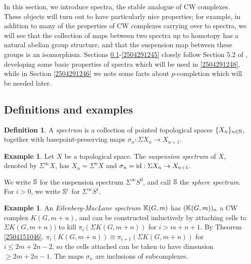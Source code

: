 \documentclass[11pt, titlepage]{article} %
\def\bb{\ensuremath\mathbb}
\def\nat{\ensuremath\mathbb{N}}
\def\id{\ensuremath\text{id}}
\numberwithin{equation}{subsection}
\theoremstyle{plain}
\theoremstyle{definition}
\newtheorem{definition}[theorem]{Definition}
\newtheorem{example}[theorem]{Example}
\begin{document}
In this section, we introduce spectra, the stable analogue of CW complexes. These objects will turn out to have particularly nice properties; for example, in addition to many of the properties of CW complexes carrying over to spectra, we will see that the collection of maps between two spectra up to homotopy has a natural abelian group structure, and that the suspension map between these groups is an isomorphism. Sections \ref{2504291244}-\ref{2504291245} closely follow Section 5.2 of \autocite{hatcher5}, developing some basic properties of spectra which will be used in \ref{2504291248}, while in Section \ref{2504291246} we note some facts about \(p\)-completion which will be needed later. 

\subsection{Definitions and examples}\label{2504291244}

\begin{definition}
A \textit{spectrum} is a collection of pointed topological spaces \(\{X_n\}_{n\in \nat}\), together with basepoint-preserving maps \(\sigma_n : \Sigma X_n \to X_{n+1}\).
\end{definition}

\begin{example}
Let \(X\) be a topological space. The \textit{suspension spectrum} of \(X\), denoted by \(\Sigma^\infty X\), has \(X_n=\Sigma^nX\) and \(\sigma_n=\id : \Sigma X_n \to X_{n+1}\).
\end{example}

We write \(\bb{S}\) for the suspension spectrum \(\Sigma^\infty S^0\), and call \(\bb{S}\) the \textit{sphere spectrum}. For \(i>0\), we write \(\bb{S}^i\) for \(\Sigma^\infty S^i\).%



\begin{example}\label{2504251659}
An \textit{Eilenberg-MacLane spectrum} \(\bb{K}(G,m)\) has \((\bb{K}(G,m))_n\) a CW complex \(K(G,m+n)\), and can be constructed inductively by attaching cells to \(\Sigma K(G, m+n))\) to kill \(\pi_i(\Sigma K(G, m+n))\) for \(i > m+n+1\). By Theorem \ref{2504151046}, \(\pi_i(K(G, m+n))\cong \pi_{i+1}(\Sigma K(G, m+n))\) for \(i \leq 2m+2n-2\), so the cells attached can be taken to have dimension \(\geq 2m+2n-1\). The maps \(\sigma_n\) are inclusions of subcomplexes. 
\end{example}
\end{document}
